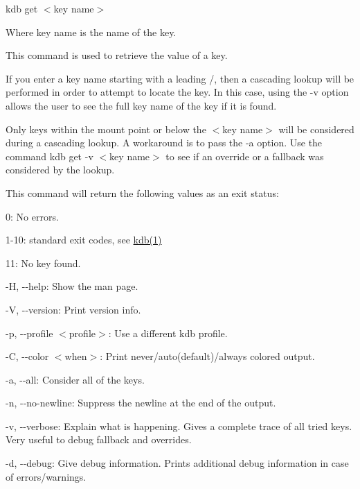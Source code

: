 {\ttfamily kdb get $<$key name$>$}

Where {\ttfamily key name} is the name of the key.

This command is used to retrieve the value of a key.

If you enter a {\ttfamily key name} starting with a leading {\ttfamily /}, then a cascading lookup will be performed in order to attempt to locate the key. In this case, using the {\ttfamily -\/v} option allows the user to see the full key name of the key if it is found.

Only keys within the mount point or below the {\ttfamily $<$key name$>$} will be considered during a cascading lookup. A workaround is to pass the {\ttfamily -\/a} option. Use the command {\ttfamily kdb get -\/v $<$key name$>$} to see if an override or a fallback was considered by the lookup.

This command will return the following values as an exit status\+:


\begin{DoxyItemize}
\item 0\+: No errors.
\item 1-\/10\+: standard exit codes, see \hyperlink{doc_help_kdb_md}{kdb(1)}
\item 11\+: No key found.
\end{DoxyItemize}


\begin{DoxyItemize}
\item {\ttfamily -\/H}, {\ttfamily -\/-\/help}\+: Show the man page.
\item {\ttfamily -\/V}, {\ttfamily -\/-\/version}\+: Print version info.
\item {\ttfamily -\/p}, {\ttfamily -\/-\/profile $<$profile$>$}\+: Use a different kdb profile.
\item {\ttfamily -\/C}, {\ttfamily -\/-\/color $<$when$>$}\+: Print never/auto(default)/always colored output.
\item {\ttfamily -\/a}, {\ttfamily -\/-\/all}\+: Consider all of the keys.
\item {\ttfamily -\/n}, {\ttfamily -\/-\/no-\/newline}\+: Suppress the newline at the end of the output.
\item {\ttfamily -\/v}, {\ttfamily -\/-\/verbose}\+: Explain what is happening. Gives a complete trace of all tried keys. Very useful to debug fallback and overrides.
\item {\ttfamily -\/d}, {\ttfamily -\/-\/debug}\+: Give debug information. Prints additional debug information in case of errors/warnings.
\end{DoxyItemize}


